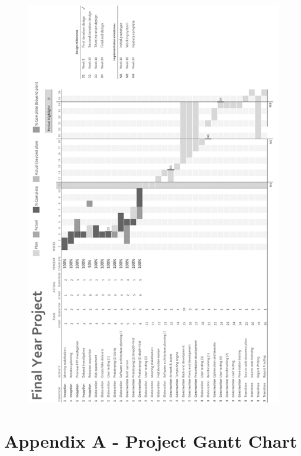 \documentclass[12pt,a4paper]{article}
\begin{document}
\begin{figure}[H]
\centering
\includegraphics{assets/gantt-plan.png}
\label{fig:graph-interval-dropped}
\end{figure}

\newpage
\section{Appendix A - Project Gantt Chart}
\end{document}
